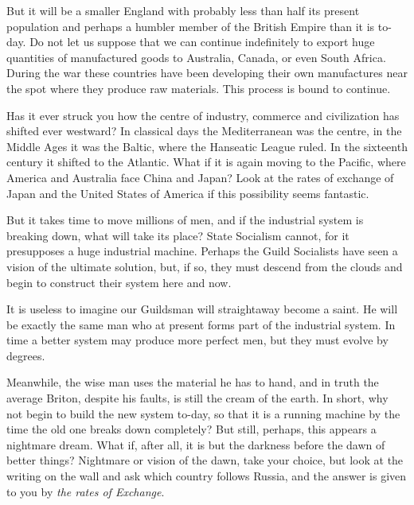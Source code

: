 \documentclass{book}
\begin{document}
But it will be a smaller England with probably less than half its present population and perhaps a humbler member of the British Empire than it is to-day. Do not let us suppose that we can continue indefinitely to export huge quantities of manufactured goods to Australia, Canada, or even South Africa. During the war these countries have been developing their own manufactures near the spot where they produce raw materials. This process is bound to continue.

Has it ever struck you how the centre of industry, commerce and civilization has shifted ever westward? In classical days the Mediterranean was the centre, in the Middle Ages it was the Baltic, where the Hanseatic League ruled. In the sixteenth century it shifted to the Atlantic. What if it is again moving to the Pacific, where America and Australia face China and Japan? Look at the rates of exchange of Japan and the United States of America if this possibility seems fantastic.

But it takes time to move millions of men, and if the industrial system is breaking down, what will take its place? State Socialism cannot, for it presupposes a huge industrial machine. Perhaps the Guild Socialists have seen a vision of the ultimate solution, but, if so, they must descend from the clouds and begin to construct their system here and now.

It is useless to imagine our Guildsman will straightaway become a saint. He will be exactly the same man who at present forms part of the industrial system. In time a better system may produce more perfect men, but they must evolve by degrees.

Meanwhile, the wise man uses the material he has to hand, and in truth the average Briton, despite his faults, is still the cream of the earth. In short, why not begin to build the new system to-day, so that it is a running machine by the time the old one breaks down completely? But still, perhaps, this appears a nightmare dream. What if, after all, it is but the darkness before the dawn of better things? Nightmare or vision of the dawn, take your choice, but look at the writing on the wall and ask which country follows Russia, and the answer is given to you by \emph{the rates of Exchange}.

\end{document}
